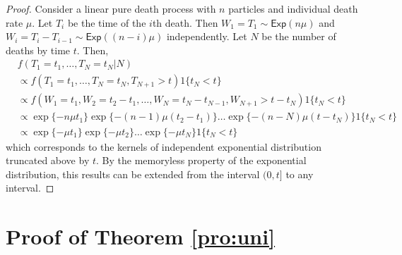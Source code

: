 \documentclass[12pt]{article}
\begin{document}
\begin{proof}
	Consider a linear pure death process with $n$ particles and individual death rate $\mu$.
	Let $T_i$ be the time of the $i$th death. Then $W_1 = T_1 \sim \textsf{Exp}(n\mu)$ and $W_i = T_i - T_{i-1} \sim \textsf{Exp}((n-i)\mu)$ independently. Let $N$ be the number of deaths by time $t$. Then, 
	\begin{align*}
		& f(T_1 = t_1, \dots, T_N = t_N | N) \\
		& \propto f(T_1 = t_1, \dots, T_N = t_N, T_{N+1} > t) 1\{t_N < t\}\\
		& \propto f(W_1 = t_1, W_2 = t_2 - t_1, \dots, W_N = t_N - t_{N-1}, W_{N+1} > t - t_N) 1\{t_N < t\}\\
		& \propto \exp\{-n\mu t_1\} \exp\{-(n-1)\mu(t_2-t_1)\}\dots \exp\{-(n-N)\mu(t - t_N)\} 1\{t_N < t\}\\
		& \propto \exp\{-\mu t_1\}\exp\{-\mu t_2\} \dots \exp\{-\mu t_N\} 1\{t_N < t\}
	\end{align*}
	which corresponds to the kernels of independent exponential distribution truncated above by $t$. By the memoryless property of the exponential distribution, this results can be extended from the interval $(0, t]$ to any interval.
	
\end{proof}


\section{Proof of Theorem \ref{pro:uni}}
\label{app:uni}
\end{document}

